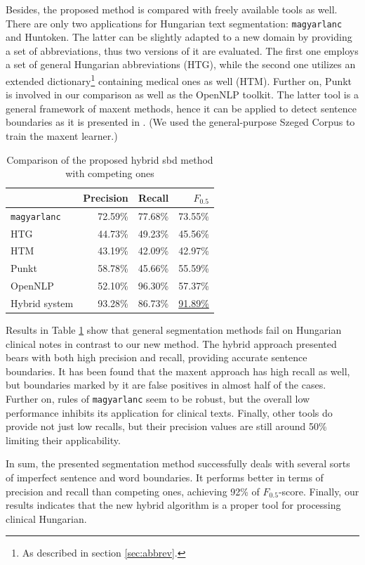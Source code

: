 Besides, the proposed method is compared with freely available tools as well.
There are only two applications for Hungarian text segmentation: \texttt{magyarlanc} and Huntoken.
The latter can be slightly adapted to a new domain by providing a set of abbreviations, thus two versions of it are evaluated. 
The first one employs a set of general Hungarian abbreviations (HTG), while the second one utilizes an extended dictionary\footnote{As described in section \ref{sec:abbrev}.} containing medical ones as well (HTM). 
Further on, Punkt \cite{kiss2006unsupervised} is involved in our comparison as well as the OpenNLP \cite{Baldridge2002} toolkit. 
The latter tool is a general framework of \acrlong{maxent} methods, hence it can be applied to detect sentence boundaries as it is presented in \cite{reynar1997maximum}.
(We used the general-purpose Szeged Corpus to train the \acrlong{maxent} learner.) 

\begin{table}[h]
\centering
\caption{Comparison of the proposed hybrid \acrshort{sbd} method with competing ones}
\label{tab:comparison}
\begin{tabular}{ l r r r} 
\hline
& Precision & Recall & $F_{0.5}$ \\
\hline
\texttt{magyarlanc} & 72.59\% & 77.68\% & 73.55\% \\
HTG & 44.73\% & 49.23\% & 45.56\% \\
HTM & 43.19\% & 42.09\% & 42.97\% \\
Punkt & 58.78\% & 45.66\% & 55.59\%  \\
OpenNLP & 52.10\% & 96.30\% & 57.37\% \\
Hybrid system & 93.28\% & 86.73\% & \underline{91.89\%} \\
\hline
\end{tabular}
\end{table}

Results in Table \ref{tab:comparison} show that general segmentation methods fail on Hungarian clinical notes in contrast to our new method. 
The hybrid approach presented bears with both high precision and recall, providing accurate sentence boundaries.
It has been found that the \acrshort{maxent} approach has high recall as well, but boundaries marked by it are false positives in almost half of the cases. 
Further on, rules of \texttt{magyarlanc} seem to be robust, but the overall low performance inhibits its application for clinical texts. 
Finally, other tools do provide not just low recalls, but their precision values are still around 50\% limiting their applicability. 

In sum, the presented segmentation method successfully deals with several sorts of imperfect sentence and word boundaries.
It performs better in terms of precision and recall than competing ones, achieving 92\% of $F_{0.5}$-score. 
Finally, our results indicates that the new hybrid algorithm is a proper tool for processing clinical Hungarian.


